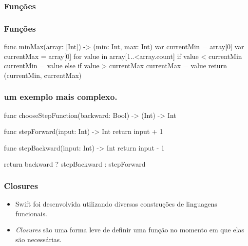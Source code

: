 \begin{frame}[fragile]
    \frametitle{Funções}

\end{frame}

\begin{frame}[fragile]
    \frametitle{Funções}

    \begin{swift}
        func minMax(array: [Int]) -> (min: Int, max: Int) {
            var currentMin = array[0]
            var currentMax = array[0]
            for value in array[1..<array.count] {
                if value < currentMin {
                    currentMin = value
                } else if value > currentMax {
                    currentMax = value
                }
            }
            return (currentMin, currentMax)
        }
    \end{swift}
\end{frame}

\begin{frame}[fragile]
    \frametitle{um exemplo mais complexo.}

    \begin{swift}
        func chooseStepFunction(backward: Bool) -> (Int) -> Int
        {
            func stepForward(input: Int) -> Int
            { return input + 1 }

            func stepBackward(input: Int) -> Int
            { return input - 1 }

            return backward ? stepBackward : stepForward
        }
    \end{swift}
\end{frame}

\begin{frame}[fragile]
    \frametitle{Closures}

    \begin{itemize}
        \item Swift foi desenvolvida utilizando diversas construções de
        linguagens funcionais.
        \item \textit{Closures} são uma forma leve de definir uma função
        no momento em que elas são necessárias.
    \end{itemize}
\end{frame}

